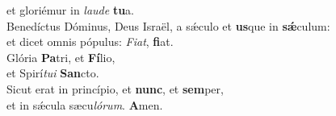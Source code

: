 \evenverse et gloriémur in \textit{lau}\textit{de} \textbf{tu}a.\\
\oddverse Benedíctus Dóminus, Deus Israël, a sǽculo et \textbf{us}que in \textbf{sǽ}culum:~\*\\
\oddverse et dicet omnis pópulus: \textit{Fi}\textit{at}, \textbf{fi}at.\\
\evenverse Glória \textbf{Pa}tri, et \textbf{Fí}lio,~\*\\
\evenverse et Spirí\textit{tu}\textit{i} \textbf{San}cto.\\
\oddverse Sicut erat in princípio, et \textbf{nunc}, et \textbf{sem}per,~\*\\
\oddverse et in sǽcula sæcu\textit{ló}\textit{rum}. \textbf{A}men.\\
